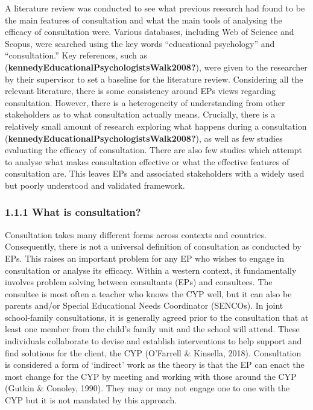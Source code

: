 \documentclass[
  english,
  man]{apa7}
\begin{document}
A literature review was conducted to see what previous research had found to be the main features of consultation and what the main tools of analysing the efficacy of consultation were. Various databases, including Web of Science and Scopus, were searched using the key words ``educational psychology'' and ``consultation.'' Key references, such as (\textbf{kennedyEducationalPsychologistsWalk2008?}), were given to the researcher by their supervisor to set a baseline for the literature review. Considering all the relevant literature, there is some consistency around EPs views regarding consultation. However, there is a heterogeneity of understanding from other stakeholders as to what consultation actually means. Crucially, there is a relatively small amount of research exploring what happens during a consultation (\textbf{kennedyEducationalPsychologistsWalk2008?}), as well as few studies evaluating the efficacy of consultation. There are also few studies which attempt to analyse what makes consultation effective or what the effective features of consultation are. This leaves EPs and associated stakeholders with a widely used but poorly understood and validated framework.

\hypertarget{what-is-consultation}{%
\subsubsection{1.1.1 What is consultation?}\label{what-is-consultation}}

Consultation takes many different forms across contexts and countries. Consequently, there is not a universal definition of consultation as conducted by EPs. This raises an important problem for any EP who wishes to engage in consultation or analyse its efficacy. Within a western context, it fundamentally involves problem solving between consultants (EPs) and consultees. The consultee is most often a teacher who knows the CYP well, but it can also be parents and/or Special Educational Needs Coordinator (SENCOs). In joint school-family consultations, it is generally agreed prior to the consultation that at least one member from the child's family unit and the school will attend. These individuals collaborate to devise and establish interventions to help support and find solutions for the client, the CYP (O'Farrell \& Kinsella, 2018). Consultation is considered a form of `indirect' work as the theory is that the EP can enact the most change for the CYP by meeting and working with those around the CYP (Gutkin \& Conoley, 1990). They may or may not engage one to one with the CYP but it is not mandated by this approach.
\end{document}
